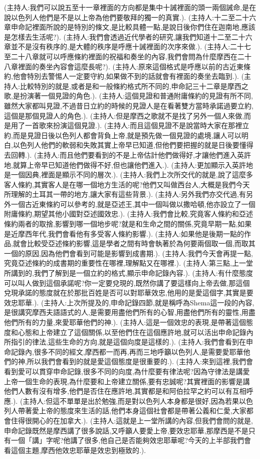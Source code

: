 \documentclass{book}
\begin{document}
(主持人:我們可以說五至十一章裡面的方向都是集中十誡裡面的頭一兩個誡命,是在說以色列人他們是不是以上帝為他們要敬拜的獨一的真實.).
(主持人:十二至二十六章申命記裡面所說的是特別的條文,是比較具體一點,是說日後你們住在迦南地,應該是怎樣去生活呢?).
(主持人:我們會透過近代學者的研究,讓我們知道十二至二十六章並不是沒有秩序的,是大體的秩序是呼應十誡裡面的次序來做.).
(主持人:二十七至二十八章就可以呼應條約裡面的祝福和奏坐的內容,我們會問為什麼摩西在二十八章裡面的奏坐內容會這麼長呢?).
(主持人:原來這個格式是呼應以前的古近東條約,他會特別去警惕人一定要守約,如果做不到的話就會有裡面的奏坐去臨到.).
(主持人:比較特別的就是,或者是和一般條約格式所不同的,申命記三十二章是摩西之歌,是扮演著一個見證的角色.).
(主持人:這個見證和普通附庸條約的見證有所不同,雖然大家都叫見證,不過昔日立約的時候的見證人是在看著雙方當時承諾過要立約,這個是那個見證人的角色.).
(主持人:但是摩西之歌就不是找了另外一個人來做,而是用了一首歌來扮演這個見證.).
(主持人:而且這個見證不是說當時大家在那裡立約,而是見證日後以色列人都會背負上帝,就是預先做一個見證的處境,讓人可以明白,以色列人他們的軟弱和失敗其實上帝早已知道,但他們要把握的就是日後要懂得去回轉.).
(主持人:而且他們要看到的不是上帝估計他們做得好,才讓他們進入英許地,就算上帝早已知道他們做得不好,但也讓他們進入.).
(主持人:更加顯示入英許地是一個因典,裡面是顯示不同的層次.).
(主持人:我們上次所交代的就是,說了這麼多客人條約,其實客人是在哪一個地方生活的呢?他們又叫做西台人,大概是我們今天所理解的土耳其一帶的地方,讓大家有這些背景.).
(主持人:另外我們亦交代過,有另外一個古近東條約可以參考的,就是亞述王,其中一個叫做以撒哈頓,他亦設立了一個附庸條約,期望其他小國對亞述國效忠.).
(主持人:我們會比較,究竟客人條約和亞述條約兩者的取捨,影響到哪一個地步呢?就是和生命之間的關係,究竟早期一點,如果是近摩西年代,我們會看他有多受客人條約影響.).
(主持人:如果他是後期一點的作品,就會比較受亞述條約影響,這是學者之間有時會執著於為何要兩個取一個,而取其一個的原因,因為他們會看到可能是影響到成書期.).
(主持人:我們今天會再提一點,究竟亞述條約的成書期的重要性在哪裡,理解點又在哪裡.).
(主持人:第三點,上一堂所講到的,我們了解到是一個立約的格式,顯示申命記錄內容.).
(主持人:有什麼態度可以叫人做到這個承諾呢?你一定要兌現的,既然你講了要這樣向上帝去做,那這個兌現承諾的態度就在於那批百姓是否可以對耶華效忠,他用的是愛這個字,其實是要效忠耶華.).
(主持人:上次所提及的,申命記錄四節,就是稱呼為Shema這一段的內容,是很講究摩西夫語語式的人,是需要用盡他們所有的心智,用盡他們所有的靈性,用盡他們所有的力量,來愛耶華他們的神.).
(主持人:這是一個效忠的表現,是帶著這個態度和心態和上帝建立了這個關係,以至他們住在這個應許地,就可以活出申命記錄內所指引的律法,這些生命的方向,就是這個向度是這樣的.).
(主持人:我們會看到在申命記錄內,很多不同的經文,摩西都一而再,再而三地呼籲以色列人,是需要愛耶華他們的神,所以我們會看到的就是愛這個態度是很重要的.).
(主持人:來到這裡,我們會看到愛可以貫穿申命記錄,很多不同的向度,為什麼要有律法呢?因為守律法是講愛上帝一個生命的表現,為什麼要和上帝建立關係,要有忠誠呢?其實裡面的影響是講他們人數有沒有增多,他們是否住在應許地,其實都是和阿伯拉罕之約可以有互相呼應.).
(主持人:但這不單單是出於勉強,而是對以色列人本身都是很好,因為若果以色列人帶著愛上帝的態度來生活的話,他們本身這個社會都是帶著公義和仁愛,大家都會住得很開心的在加拿大.).
(主持人:這就是上一堂所講的內容,但我們會問的就是,申命記錄既然是摩西講了很多說話,又呼籲人要愛上帝,要效忠耶華,那摩西是不是只有一個「講」字呢?他講了很多,他自己是否能夠效忠耶華呢?今天的上半部我們會看這個主題,摩西他效忠耶華是效忠到極致的.).
\end{document}
